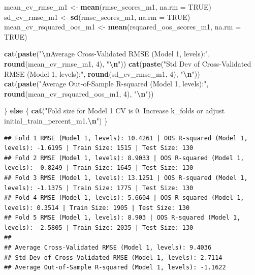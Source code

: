\documentclass[
]{article}
\newenvironment{Shaded}{\begin{snugshade}}{\end{snugshade}}
\newcommand{\AttributeTok}[1]{\textcolor[rgb]{0.13,0.29,0.53}{#1}}
\newcommand{\ConstantTok}[1]{\textcolor[rgb]{0.56,0.35,0.01}{#1}}
\newcommand{\ControlFlowTok}[1]{\textcolor[rgb]{0.13,0.29,0.53}{\textbf{#1}}}
\newcommand{\DecValTok}[1]{\textcolor[rgb]{0.00,0.00,0.81}{#1}}
\newcommand{\FunctionTok}[1]{\textcolor[rgb]{0.13,0.29,0.53}{\textbf{#1}}}
\newcommand{\NormalTok}[1]{#1}
\newcommand{\OtherTok}[1]{\textcolor[rgb]{0.56,0.35,0.01}{#1}}
\newcommand{\SpecialCharTok}[1]{\textcolor[rgb]{0.81,0.36,0.00}{\textbf{#1}}}
\newcommand{\StringTok}[1]{\textcolor[rgb]{0.31,0.60,0.02}{#1}}
\begin{document}
\begin{Shaded}
\begin{Highlighting}[]
\NormalTok{    mean\_cv\_rmse\_m1 }\OtherTok{\textless{}{-}} \FunctionTok{mean}\NormalTok{(rmse\_scores\_m1, }\AttributeTok{na.rm =} \ConstantTok{TRUE}\NormalTok{)}
\NormalTok{    sd\_cv\_rmse\_m1 }\OtherTok{\textless{}{-}} \FunctionTok{sd}\NormalTok{(rmse\_scores\_m1, }\AttributeTok{na.rm =} \ConstantTok{TRUE}\NormalTok{)}
\NormalTok{    mean\_cv\_rsquared\_oos\_m1 }\OtherTok{\textless{}{-}} \FunctionTok{mean}\NormalTok{(rsquared\_oos\_scores\_m1, }\AttributeTok{na.rm =} \ConstantTok{TRUE}\NormalTok{)}
    
    \FunctionTok{cat}\NormalTok{(}\FunctionTok{paste}\NormalTok{(}\StringTok{"}\SpecialCharTok{\textbackslash{}n}\StringTok{Average Cross{-}Validated RMSE (Model 1, levels):"}\NormalTok{, }\FunctionTok{round}\NormalTok{(mean\_cv\_rmse\_m1, }\DecValTok{4}\NormalTok{), }\StringTok{"}\SpecialCharTok{\textbackslash{}n}\StringTok{"}\NormalTok{))}
    \FunctionTok{cat}\NormalTok{(}\FunctionTok{paste}\NormalTok{(}\StringTok{"Std Dev of Cross{-}Validated RMSE (Model 1, levels):"}\NormalTok{, }\FunctionTok{round}\NormalTok{(sd\_cv\_rmse\_m1, }\DecValTok{4}\NormalTok{), }\StringTok{"}\SpecialCharTok{\textbackslash{}n}\StringTok{"}\NormalTok{))}
    \FunctionTok{cat}\NormalTok{(}\FunctionTok{paste}\NormalTok{(}\StringTok{"Average Out{-}of{-}Sample R{-}squared (Model 1, levels):"}\NormalTok{, }\FunctionTok{round}\NormalTok{(mean\_cv\_rsquared\_oos\_m1, }\DecValTok{4}\NormalTok{), }\StringTok{"}\SpecialCharTok{\textbackslash{}n}\StringTok{"}\NormalTok{))}
    
\NormalTok{  \} }\ControlFlowTok{else}\NormalTok{ \{}
    \FunctionTok{cat}\NormalTok{(}\StringTok{"Fold size for Model 1 CV is 0. Increase k\_folds or adjust initial\_train\_percent\_m1.}\SpecialCharTok{\textbackslash{}n}\StringTok{"}\NormalTok{)}
\NormalTok{  \}}
\end{Highlighting}
\end{Shaded}

\begin{verbatim}
## Fold 1 RMSE (Model 1, levels): 10.4261 | OOS R-squared (Model 1, levels): -1.6195 | Train Size: 1515 | Test Size: 130 
## Fold 2 RMSE (Model 1, levels): 8.9033 | OOS R-squared (Model 1, levels): -0.8249 | Train Size: 1645 | Test Size: 130 
## Fold 3 RMSE (Model 1, levels): 13.1251 | OOS R-squared (Model 1, levels): -1.1375 | Train Size: 1775 | Test Size: 130 
## Fold 4 RMSE (Model 1, levels): 5.6604 | OOS R-squared (Model 1, levels): 0.3514 | Train Size: 1905 | Test Size: 130 
## Fold 5 RMSE (Model 1, levels): 8.903 | OOS R-squared (Model 1, levels): -2.5805 | Train Size: 2035 | Test Size: 130 
## 
## Average Cross-Validated RMSE (Model 1, levels): 9.4036 
## Std Dev of Cross-Validated RMSE (Model 1, levels): 2.7114 
## Average Out-of-Sample R-squared (Model 1, levels): -1.1622
\end{verbatim}
\end{document}
